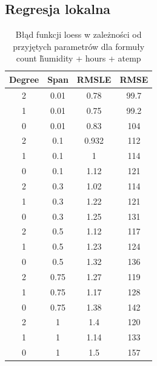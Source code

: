 \documentclass[a4paper,12pt]{article}
\begin{document}
	\subsection{Regresja lokalna}
		\begin{table}[h]
			\begin{tabular}{|c|c|c|c|}
				\hline 
				Degree & Span & RMSLE & RMSE \\ 
				\hline 
				2 & 0.01 & 0.78
				& 99.7 \\ 
				\hline 
				1 & 0.01 & 0.75 & 99.2 \\ 
				\hline 
				0 & 0.01 & 0.83 & 104 \\ 
				\hline 
				2 & 0.1 & 0.932 & 112 \\ 
				\hline 
				1 & 0.1 & 1 & 114 \\ 
				\hline 
				0 & 0.1 & 1.12 & 121 \\ 
				\hline 
				2 & 0.3 & 1.02 & 114 \\ 
				\hline 
				1 & 0.3 & 1.22 & 121 \\ 
				\hline 
				0 & 0.3 & 1.25 & 131 \\ 
				\hline 
				2 & 0.5 & 1.12 & 117 \\ 
				\hline 
				1 & 0.5 & 1.23 & 124 \\ 
				\hline 
				0 & 0.5 & 1.32 & 136 \\ 
				\hline 
				2 & 0.75 & 1.27 & 119 \\ 
				\hline 
				1 & 0.75 & 1.17 & 128 \\ 
				\hline 
				0 & 0.75 & 1.38 & 142 \\ 
				\hline 
				2 & 1 & 1.4 & 120 \\ 
				\hline 
				1 & 1 & 1.14 & 133 \\ 
				\hline 
				0 & 1 & 1.5 & 157 \\ 
				\hline 
			\end{tabular}
			\caption{Błąd funkcji loess w zależności od przyjętych parametrów dla formuły count \~ humidity + hours + atemp} 
		\end{table}
\end{document}
